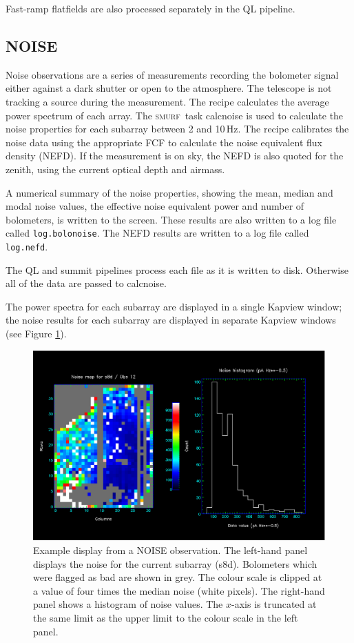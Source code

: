 \documentclass[twoside,11pt]{article}
\renewcommand{\_}{\texttt{\symbol{95}}}
\newcommand{\SMURF}{\textsc{smurf}}
\newcommand{\task}[1]{\textsf{#1}}
\begin{document}
Fast-ramp flatfields are also processed separately in the QL pipeline.

\subsection{NOISE}

Noise observations are a series of measurements recording the
bolometer signal either against a dark shutter or open to the
atmosphere. The telescope is not tracking a source during the
measurement. The recipe calculates the average power spectrum of each
array. The \SMURF\ task \task{calcnoise} is used to calculate the
noise properties for each subarray between 2 and 10\,Hz. The recipe
calibrates the noise data using the appropriate FCF to calculate the
noise equivalent flux density (NEFD). If the measurement is on sky,
the NEFD is also quoted for the zenith, using the current optical
depth and airmass.

A numerical summary of the noise properties, showing the mean, median
and modal noise values, the effective noise equivalent power and
number of bolometers, is written to the screen. These results are also
written to a log file called \verb+log.bolonoise+. The NEFD results
are written to a log file called \verb+log.nefd+.

The QL and summit pipelines process each file as it is written to
disk. Otherwise all of the data are passed to \task{calcnoise}.

The power spectra for each subarray are displayed in a single Kapview
window; the noise results for each subarray are displayed in separate
Kapview windows (see Figure \ref{fig:noise}).

\begin{figure}[t]
\centering
\includegraphics[width=\textwidth]{sun264_noise.eps}
\caption{Example display from a NOISE observation. The left-hand panel
  displays the noise for the current subarray (s8d). Bolometers which
  were flagged as bad are shown in grey. The colour scale is clipped
  at a value of four times the median noise (white pixels). The
  right-hand panel shows a histogram of noise values. The $x$-axis is
  truncated at the same limit as the upper limit to the colour scale
  in the left panel.\label{fig:noise}}
\end{figure}
\end{document}
